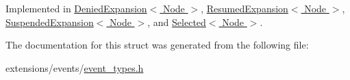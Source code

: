 Implemented in \hyperlink{structDeniedExpansion_a63345504b8619889a1d7f8236f037693}{Denied\+Expansion$<$ Node $>$}, \hyperlink{structResumedExpansion_afb6f30343497e1361a86d9657f528936}{Resumed\+Expansion$<$ Node $>$}, \hyperlink{structSuspendedExpansion_a16941d1b48ab9ce0a822c380b5e42b90}{Suspended\+Expansion$<$ Node $>$}, and \hyperlink{structSelected_a02f655f0ca3eee7b0697ad8a2bd7df2f}{Selected$<$ Node $>$}.



The documentation for this struct was generated from the following file\+:\begin{DoxyCompactItemize}
\item 
extensions/events/\hyperlink{event__types_8h}{event\+\_\+types.\+h}\end{DoxyCompactItemize}
